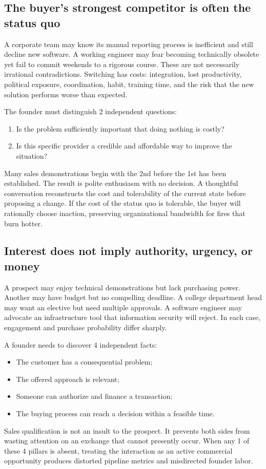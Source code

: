 \subsection{The buyer's strongest competitor is often the status quo}

A corporate team may know its manual reporting process is inefficient and still decline new software. A working engineer may fear becoming technically obsolete yet fail to commit weekends to a rigorous course. These are not necessarily irrational contradictions. Switching has costs: integration, lost productivity, political exposure, coordination, habit, training time, and the risk that the new solution performs worse than expected.

The founder must distinguish 2 independent questions:
\begin{enumerate}
\item Is the problem sufficiently important that doing nothing is costly?
\item Is this specific provider a credible and affordable way to improve the situation?
\end{enumerate}
Many sales demonstrations begin with the 2nd before the 1st has been established. The result is polite enthusiasm with no decision. A thoughtful conversation reconstructs the cost and tolerability of the current state before proposing a change. If the cost of the status quo is tolerable, the buyer will rationally choose inaction, preserving organizational bandwidth for fires that burn hotter.

\subsection{Interest does not imply authority, urgency, or money}

A prospect may enjoy technical demonstrations but lack purchasing power. Another may have budget but no compelling deadline. A college department head may want an elective but need multiple approvals. A software engineer may advocate an infrastructure tool that information security will reject. In each case, engagement and purchase probability differ sharply.

A founder needs to discover 4 independent facts:
\begin{itemize}
\item The customer has a consequential problem;
\item The offered approach is relevant;
\item Someone can authorize and finance a transaction;
\item The buying process can reach a decision within a feasible time.
\end{itemize}
Sales qualification is not an insult to the prospect. It prevents both sides from wasting attention on an exchange that cannot presently occur. When any 1 of these 4 pillars is absent, treating the interaction as an active commercial opportunity produces distorted pipeline metrics and misdirected founder labor.

